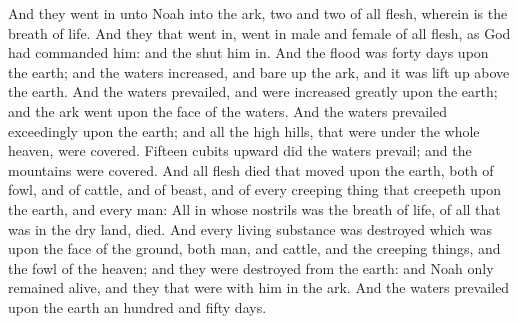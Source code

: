 \begin{biblechapter}
\verse And they went in unto Noah into the ark, two and two of all flesh, wherein is the breath of life.
\verse And they that went in, went in male and female of all flesh, as God had commanded him: and the \LORD shut him in.
\verse And the flood was forty days upon the earth; and the waters increased, and bare up the ark, and it was lift up above the earth.
\verse And the waters prevailed, and were increased greatly upon the earth; and the ark went upon the face of the waters.
\verse And the waters prevailed exceedingly upon the earth; and all the high hills, that were under the whole heaven, were covered.
\verse Fifteen cubits upward did the waters prevail; and the mountains were covered.
\verse And all flesh died that moved upon the earth, both of fowl, and of cattle, and of beast, and of every creeping thing that creepeth upon the earth, and every man:
\verse All in whose nostrils was the breath of life, of all that was in the dry land, died.
\verse And every living substance was destroyed which was upon the face of the ground, both man, and cattle, and the creeping things, and the fowl of the heaven; and they were destroyed from the earth: and Noah only remained alive, and they that were with him in the ark.
\verse And the waters prevailed upon the earth an hundred and fifty days.
\end{biblechapter}

